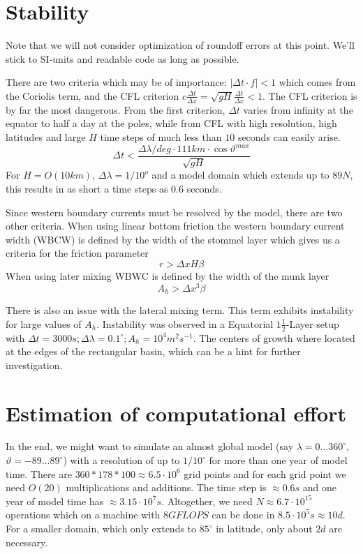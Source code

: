 \documentclass[a4paper]{article}
\begin{document}

\section{Stability}
Note that we will not consider optimization of roundoff errors at this point. We'll stick
to SI-units and readable code as long as possible.

There are two criteria which may be of importance: $|\Delta t\cdot f|<1$ which comes from the
Coriolis term, and the CFL criterion $c\frac{\Delta t}{\Delta x}=\sqrt{gH}\frac{\Delta t}{\Delta x}<1$. The CFL
criterion is by far the most dangerous. From the first criterion, $\Delta t$ varies from infinity
at the equator to half a day at the poles, while from CFL with high resolution, high latitudes and 
large $H$ time steps of much less than $10$ seconds can easily arise.
\begin{equation}
  \Delta t < \frac{\Delta\lambda/deg \cdot 111km \cdot \cos\vartheta^{max}}{\sqrt{gH}} 
\end{equation}
For $H=O(10km)$, $\Delta\lambda=1/10^{o}$ and a model domain which extends up to $89N$, this results in 
as short a time steps as $0.6$ seconds.

Since western boundary currents must be resolved by the model, there are two other criteria. When using linear bottom friction the western boundary current width (WBCW) is defined by the width of the stommel layer which gives us a criteria for the friction parameter $$r>\Delta x H \beta$$
When using later mixing WBWC is defined by the width of the munk layer $$A_h > \Delta x^3\beta$$

There is also an issue with the lateral mixing term. This term exhibits instability for large values of
$A_h$. Instability was observed in a Equatorial $1\frac12$-Layer setup with $\Delta t=3000s ; \Delta\lambda=0.1^\circ; A_h = 10^4 m^2s^{-1}$.
The centers of growth where located at the edges of the rectangular basin, which can be a hint for further investigation.

\section{Estimation of computational effort}
In the end, we might want to simulate an almost global model
(say $\lambda=0\ldots360^\circ$, $\vartheta=-89\ldots89^\circ$) with a resolution 
of up to $1/10^\circ$ for more than one year of model time. There are 
$360*178*100\approx 6.5\cdot10^6$ grid points and for each grid point we need $O(20)$ 
multiplications and additions. The time step is $\approx 0.6s$ and one year of model time
has $\approx 3.15\cdot 10^7s$. Altogether, we need $N\approx 6.7\cdot 10^{15}$ operations which
on a machine with $8GFLOPS$ can be done in $8.5\cdot 10^5s\approx 10d$. For a smaller domain, which
only extends to $85^\circ$ in latitude, only about $2d$ are necessary.
\end{document}
